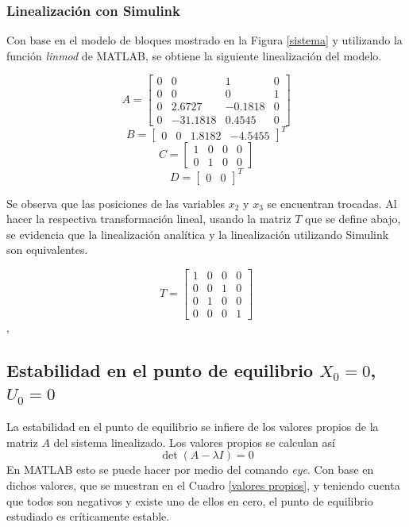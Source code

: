 \documentclass[journal]{IEEEtran}
\begin{document}
\subsubsection{Linealización con Simulink}
Con base en el modelo de bloques mostrado en la Figura \ref{sistema} y utilizando la función \textit{linmod} de MATLAB, se obtiene la siguiente linealización del modelo.

\[A =\begin{bmatrix}
    0 & 0 & 1 & 0\\
    0 & 0 & 0 & 1\\
    0 & 2.6727 & -0.1818 & 0\\
    0 & -31.1818 & 0.4545 & 0
\end{bmatrix}
\]
\[B = \begin{bmatrix}
    0 &
    0 &
    1.8182 &
    -4.5455
\end{bmatrix}^{T}\]
\[C = \begin{bmatrix}
    1 & 0 & 0 & 0\\
    0 & 1 & 0 & 0
\end{bmatrix}\]
\[D = \begin{bmatrix}
    0&
    0
\end{bmatrix}^{T}\]

Se observa que las posiciones de las variables $x_2$ y $x_3$ se encuentran trocadas. Al hacer la respectiva transformación lineal, usando la matriz $T$ que se define abajo, se evidencia que la linealización analítica y la linealización utilizando Simulink son equivalentes.

\[T=\begin{bmatrix}
1 & 0 & 0 & 0\\
0 & 0 & 1 & 0\\
0 & 1 & 0 & 0\\
0 & 0 & 0 & 1
\end{bmatrix}\], 

\subsection{Estabilidad en el punto de equilibrio $X_0=0$, $U_0=0$}
La estabilidad en el punto de equilibrio se infiere de los valores propios de la matriz $A$ del sistema linealizado. Los valores propios se calculan así 
$$\det(A-\lambda I)=0$$ 
En MATLAB esto se puede hacer por medio del comando \textit{eye}. Con base en dichos valores, que se muestran en el Cuadro \ref{valores propios}, y teniendo cuenta que todos son negativos y existe uno de ellos en cero, el punto de equilibrio estudiado es críticamente estable.
\end{document}
